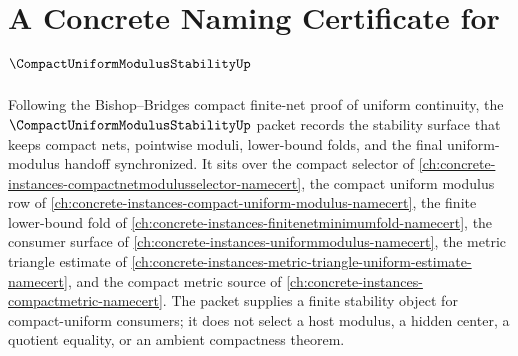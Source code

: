 \chapter{A Concrete Naming Certificate for $\CompactUniformModulusStabilityUp$}
\label{ch:concrete-instances-compact-uniform-modulus-stability-namecert}

Following the Bishop--Bridges compact finite-net proof of uniform continuity, the $\CompactUniformModulusStabilityUp$ packet records the stability surface that keeps compact nets, pointwise moduli, lower-bound folds, and the final uniform-modulus handoff synchronized. It sits over the compact selector of \autoref{ch:concrete-instances-compactnetmodulusselector-namecert}, the compact uniform modulus row of \autoref{ch:concrete-instances-compact-uniform-modulus-namecert}, the finite lower-bound fold of \autoref{ch:concrete-instances-finitenetminimumfold-namecert}, the consumer surface of \autoref{ch:concrete-instances-uniformmodulus-namecert}, the metric triangle estimate of \autoref{ch:concrete-instances-metric-triangle-uniform-estimate-namecert}, and the compact metric source of \autoref{ch:concrete-instances-compactmetric-namecert}. The packet supplies a finite stability object for compact-uniform consumers; it does not select a host modulus, a hidden center, a quotient equality, or an ambient compactness theorem.


